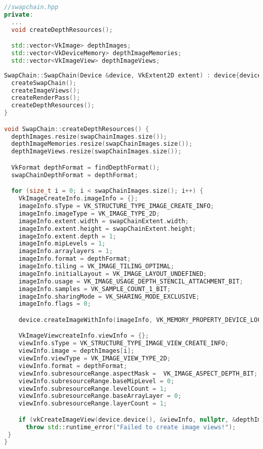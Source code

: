 \documentclass[12pt]{report} \usepackage{preamble}
\begin{document}
\begin{lstlisting}[language=C++]
//swapchain.hpp
private:
  ...
  void createDepthResources();

  std::vector<VkImage> depthImages;
  std::vector<VkDeviceMemory> depthImageMemories;
  std::vector<VkImageView> depthImageViews;
\end{lstlisting}

\begin{lstlisting}[language=C++]
SwapChain::SwapChain(Device &device, VkExtent2D extent) : device{device}, windowExtent{extent} {
  createSwapChain();
  createImageViews();
  createRenderPass();
  createDepthResources();
}

void SwapChain::createDepthResources() {
  depthImages.resize(swapChainImages.size());
  depthImageMemories.resize(swapChainImages.size());
  depthImageViews.resize(swapChainImages.size());

  VkFormat depthFormat = findDepthFormat();
  swapChainDepthFormat = depthFormat;

  for (size_t i = 0; i < swapChainImages.size(); i++) {
    VkImageCreateInfo.imageInfo = {};
    imageInfo.sType = VK_STRUCTURE_TYPE_IMAGE_CREATE_INFO;
    imageInfo.imageType = VK_IMAGE_TYPE_2D;
    imageInfo.extent.width = swapChainExtent.width;
    imageInfo.extent.height = swapChainExtent.height;
    imageInfo.extent.depth = 1;
    imageInfo.mipLevels = 1;
    imageInfo.arraylayers = 1;
    imageInfo.format = depthFormat;
    imageInfo.tiling = VK_IMAGE_TILING_OPTIMAL;
    imageInfo.initialLayout = VK_IMAGE_LAYOUT_UNDEFINED;
    imageInfo.usage = VK_IMAGE_USAGE_DEPTH_STENCIL_ATTACHMENT_BIT;
    imageInfo.samples = VK_SAMPLE_COUNT_1_BIT;
    imageInfo.sharingMode = VK_SHARING_MODE_EXCLUSIVE;
    imageInfo.flags = 0;

    device.createImageWithInfo(imageInfo, VK_MEMORY_PROPERTY_DEVICE_LOCAL_BIT, depthImages[i], depthImageMemories[i]);

    VkImageViewcreateInfo.viewInfo = {};
    viewInfo.sType = VK_STRUCTURE_TYPE_IMAGE_VIEW_CREATE_INFO;
    viewInfo.image = depthImages[i];
    viewInfo.viewType = VK_IMAGE_VIEW_TYPE_2D;
    viewInfo.format = depthFormat;
    viewInfo.subresourceRange.aspectMask =  VK_IMAGE_ASPECT_DEPTH_BIT;
    viewInfo.subresourceRange.baseMipLevel = 0;
    viewInfo.subresourceRange.levelCount = 1;
    viewInfo.subresourceRange.baseArrayLayer = 0;
    viewInfo.subresourceRange.layerCount = 1;

    if (vkCreateImageView(device.device(), &viewInfo, nullptr, &depthImageViews[i]) != VK_SUCCESS)
      throw std::runtime_error("Failed to create image views!");
 }
}
\end{lstlisting}
\end{document}
